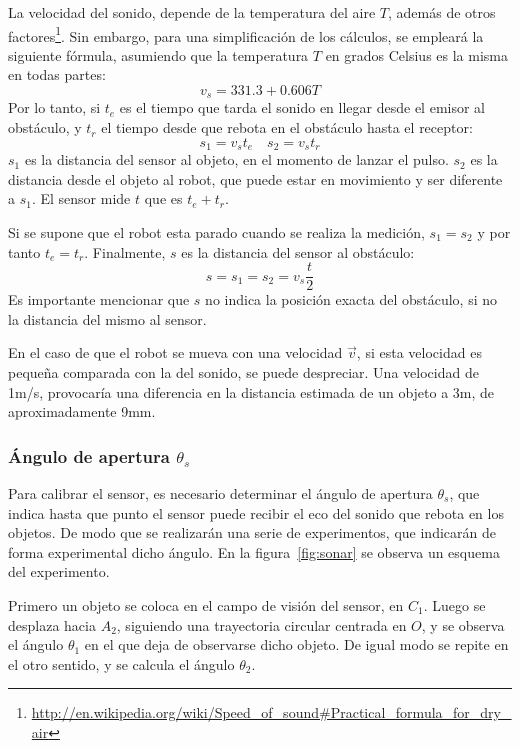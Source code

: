 \documentclass[10pt,a4paper,hidelinks,twocolumn]{article}
\begin{document}
La velocidad del sonido, depende de la temperatura del aire $T$, además de otros
factores\footnote{\url{http://en.wikipedia.org/wiki/Speed\_of\_sound\#Practical\_formula\_for\_dry\_air}}.
Sin embargo, para una simplificación de los cálculos, se empleará la siguiente
fórmula, asumiendo que la temperatura $T$ en grados Celsius es la misma en todas 
partes:
\begin{equation}
	v_{s} = 331.3 + 0.606T \label{eq:velocidad-sonido}
\end{equation}
Por lo tanto, si $t_e$ es el tiempo que tarda el sonido en llegar desde el 
emisor al obstáculo, y $t_r$ el tiempo desde que rebota en el obstáculo hasta el 
receptor:
$$ s_1 = v_{s} t_e \quad s_2 = v_{s} t_r $$
$s_1$ es la distancia del sensor al objeto, en el momento de lanzar el pulso.  
$s_2$ es la distancia desde el objeto al robot, que puede estar en movimiento y 
ser diferente a $s_1$. El sensor mide $t$ que es $t_e+t_r$.

Si se supone que el robot esta parado cuando se realiza la medición, $s_1 = s_2$ 
y por tanto $t_e = t_r$. Finalmente, $s$ es la distancia del sensor al 
obstáculo:
\begin{equation}
	s = s_1 = s_2 = v_{s}\frac{t}{2}\label{eq:velocidad-tiempo}
\end{equation}
Es importante mencionar que $s$ no indica la posición exacta del obstáculo, si 
no la distancia del mismo al sensor.

En el caso de que el robot se mueva con una velocidad $\vec{v}$, si esta 
velocidad es pequeña comparada con la del sonido, se puede despreciar. Una 
velocidad de 1m/s, provocaría una diferencia en la distancia estimada de un 
objeto a 3m, de aproximadamente 9mm.
\subsubsection{Ángulo de apertura $\theta_{s}$}
Para calibrar el sensor, es necesario determinar el ángulo de apertura 
$\theta_{s}$, que indica hasta que punto el sensor puede recibir el eco del 
sonido que rebota en los objetos. De modo que se realizarán una serie de 
experimentos, que indicarán de forma experimental dicho ángulo. En la 
figura~\ref{fig:sonar} se observa un esquema del experimento.

Primero un objeto se coloca en el campo de visión del sensor, en $C_1$. Luego se 
desplaza hacia $A_2$, siguiendo una trayectoria circular centrada en $O$, y se 
observa el ángulo $\theta_1$ en el que deja de observarse dicho objeto. De igual 
modo se repite en el otro sentido, y se calcula el ángulo $\theta_{2}$.
\end{document}
